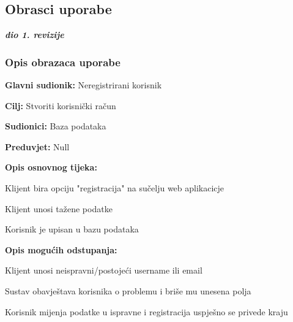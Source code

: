 			
				
			\subsection{Obrasci uporabe}
				
				\textbf{\textit{dio 1. revizije}}
				
				\subsubsection{Opis obrazaca uporabe}
					

					\noindent {}
					\begin{packed_item}
	
						\item \textbf{Glavni sudionik: }Neregistrirani korisnik
						\item  \textbf{Cilj:} Stvoriti korisnički račun
						\item  \textbf{Sudionici:} Baza podataka
						\item  \textbf{Preduvjet:} Null
						\item  \textbf{Opis osnovnog tijeka:}
						
						\item[] \begin{packed_enum}
	
							\item Klijent bira opciju "registracija" na sučelju web aplikacicje
							\item Klijent unosi tažene podatke
							\item Korisnik je upisan u bazu podataka
						\end{packed_enum}
						
						\item  \textbf{Opis mogućih odstupanja:}
						
						\item[] \begin{packed_item}
	
							\item[2.a] Klijent unosi neispravni/postojeći username ili email
							\item[] \begin{packed_enum}
								
								\item Sustav obavještava korisnika o problemu i briše mu unesena polja
								
								\item Korisnik mijenja podatke u ispravne i registracija uspješno se privede kraju
								
							\end{packed_enum}
							
						\end{packed_item}
					\end{packed_item}
					
